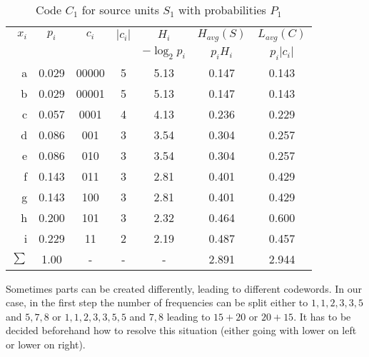 \begin{table}
  \begin{center}
    \begin{tabular}{|r|cccccc|}
      \hline
      $x_i$ & $p_i$ & $c_i$ & $|c_i|$ & $H_i$ & $H_{avg}(S)$ & $L_{avg}(C)$      \\
          &        &        &          & $-\log_2 p_i$ & $p_i H_i$ & $p_i |c_i|$      \\
      \hline
      a          & 0.029   & 00000    & 5        & 5.13  & 0.147        & 0.143              \\  
      b          & 0.029   & 00001    & 5        & 5.13  & 0.147        & 0.143              \\
      c          & 0.057   & 0001     & 4        & 4.13  & 0.236        & 0.229              \\
      d          & 0.086   & 001      & 3        & 3.54  & 0.304        & 0.257              \\
      e          & 0.086   & 010      & 3        & 3.54  & 0.304        & 0.257              \\
      f          & 0.143   & 011      & 3        & 2.81  & 0.401        & 0.429              \\  
      g          & 0.143   & 100      & 3        & 2.81  & 0.401        & 0.429              \\
      h          & 0.200   & 101      & 3        & 2.32  & 0.464        & 0.600              \\
      i          & 0.229   & 11       & 2        & 2.19  & 0.487        & 0.457              \\
      \hline
      $\sum$     & 1.00    & -        & -        & -     & 2.891        & 2.944              \\
      \hline
    \end{tabular}
  \end{center}
  \caption{Code $C_1$ for source units $S_1$ with probabilities $P_1$}
\end{table}
  
Sometimes parts can be created differently, leading to different codewords. In our case, in the first step the number of frequencies can be split either to $1, 1, 2, 3, 3, 5$ and $5, 7, 8$ or  $1, 1, 2, 3, 3, 5, 5$ and $7, 8$ leading to $15 + 20$ or $20 + 15$. It has to be decided beforehand how to resolve this situation (either going with lower on left or lower on right).

